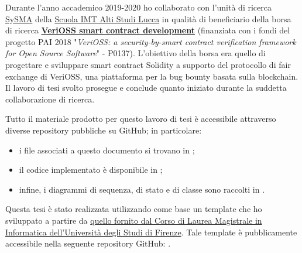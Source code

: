 Durante l'anno accademico 2019-2020 ho collaborato con l'unità di ricerca \href{https://sysma.imtlucca.it/}{SySMA} della \href{https://www.imtlucca.it/it}{Scuola IMT Alti Studi Lucca} in qualità di beneficiario della borsa di ricerca \href{https://www.imtlucca.it/it/jobopportunity/verioss-smart-contract-development}{\textbf{VeriOSS smart contract development}} (finanziata con i fondi del progetto PAI 2018 "\textit{VeriOSS: a security-by-smart contract verification framework for Open Source Software}" - P0137). L'obiettivo della borsa era quello di progettare e sviluppare smart contract Solidity a supporto del protocollo di fair exchange di VeriOSS, una piattaforma per la bug bounty basata sulla blockchain. Il lavoro di tesi svolto prosegue e conclude quanto iniziato durante la suddetta collaborazione di ricerca.

\medskip

Tutto il materiale prodotto per questo lavoro di tesi è accessibile attraverso diverse repository pubbliche su GitHub; in particolare:

\begin{itemize}

\item i file \latex associati a questo documento si trovano in \myThesisRepo;

\item il codice implementato è disponibile in \myCodeRepo;

\item infine, i diagrammi di sequenza, di stato e di classe sono raccolti in \myDiagramsRepo.

\end{itemize}

Questa tesi è stato realizzata utilizzando come base un template che ho sviluppato a partire da \href{https://www.informaticamagistrale.unifi.it/vp-17-per-laurearsi.html}{quello fornito dal Corso di Laurea Magistrale in Informatica dell'Università degli Studi di Firenze}. Tale template è pubblicamente accessibile nella seguente repository GitHub: \myThesisTemplateRepo.


